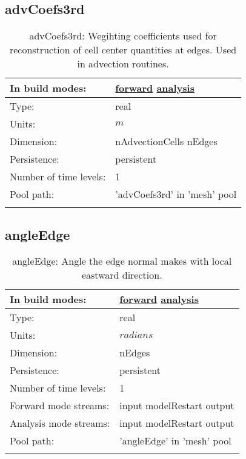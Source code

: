 \subsection[advCoefs3rd]{advCoefs3rd}
\label{subsec:var_sec_mesh_advCoefs3rd}
\begin{center}
\begin{longtable}{| p{2.0in} | p{4.0in} |}
        \hline 
        In build modes: & \hyperref[subsec:forward_var_tab_mesh]{forward} \hyperref[subsec:analysis_var_tab_mesh]{analysis} \\
        \hline 
        Type: & real \\
        \hline 
        Units: & $m$ \\
        \hline 
        Dimension: & nAdvectionCells nEdges \\
        \hline 
        Persistence: & persistent \\
        \hline 
        Number of time levels: & 1 \\
        \hline 
            Pool path: & 'advCoefs3rd' in 'mesh' pool
 \\
		 \hline 
    \caption{advCoefs3rd: Wegihting coefficients used for reconstruction of cell center quantities at edges. Used in advection routines.}
\end{longtable}
\end{center}
\subsection[angleEdge]{angleEdge}
\label{subsec:var_sec_mesh_angleEdge}
\begin{center}
\begin{longtable}{| p{2.0in} | p{4.0in} |}
        \hline 
        In build modes: & \hyperref[subsec:forward_var_tab_mesh]{forward} \hyperref[subsec:analysis_var_tab_mesh]{analysis} \\
        \hline 
        Type: & real \\
        \hline 
        Units: & $radians$ \\
        \hline 
        Dimension: & nEdges \\
        \hline 
        Persistence: & persistent \\
        \hline 
        Number of time levels: & 1 \\
        \hline 
		 Forward mode streams: &  input modelRestart output \\
        \hline 
		 Analysis mode streams: &  input modelRestart output \\
        \hline 
            Pool path: & 'angleEdge' in 'mesh' pool
 \\
		 \hline 
    \caption{angleEdge: Angle the edge normal makes with local eastward direction.}
\end{longtable}
\end{center}
